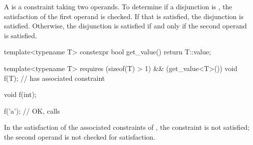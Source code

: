 \documentclass{wg21}
\begin{document}
\pnum
A  is a constraint taking two
operands.
%
To determine if a disjunction is
,
the satisfaction of
the first operand is checked.
If that is satisfied, the disjunction is satisfied.
Otherwise, the disjunction is satisfied if and only if the second
operand is satisfied.

\pnum
\begin{example}
    \begin{codeblock}
        template<typename T>
        constexpr bool get_value() { return T::value; }

        template<typename T>
        requires (sizeof(T) > 1) && (get_value<T>())
        void f(T);      // has associated constraint 

        void f(int);

        f('a'); // OK, calls 
    \end{codeblock}
    In the satisfaction of the associated constraints
    of , the constraint  is not satisfied;
    the second operand is not checked for satisfaction.
\end{example}
\end{document}
